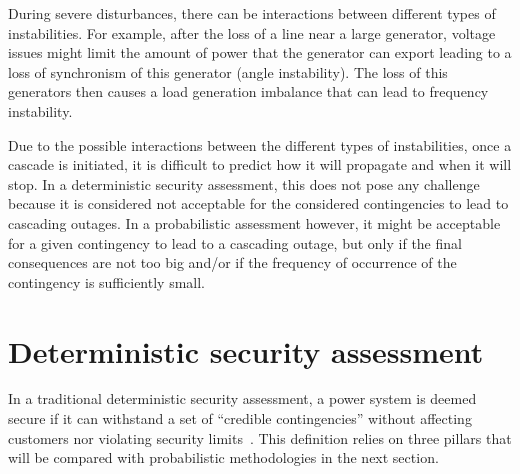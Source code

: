 During severe disturbances, there can be interactions between different types of instabilities. For example, after the loss of a line near a large generator, voltage issues might limit the amount of power that the generator can export leading to a loss of synchronism of this generator (angle instability). The loss of this generators then causes a load generation imbalance that can lead to frequency instability.


Due to the possible interactions between the different types of instabilities, once a cascade is initiated, it is difficult to predict how it will propagate and when it will stop. In a deterministic security assessment, this does not pose any challenge because it is considered not acceptable for the considered contingencies to lead to cascading outages. In a probabilistic assessment however, it might be acceptable for a given contingency to lead to a cascading outage, but only if the final consequences are not too big and/or if the frequency of occurrence of the contingency is sufficiently small.


\section{Deterministic security assessment}
\label{sec:traditionalSecurity}

In a traditional deterministic security assessment, a power system is deemed secure if it can withstand a set of ``credible contingencies'' without affecting customers nor violating security limits~\cite{N-1-ENTSOE}. This definition relies on three pillars that will be compared with probabilistic methodologies in the next section.

